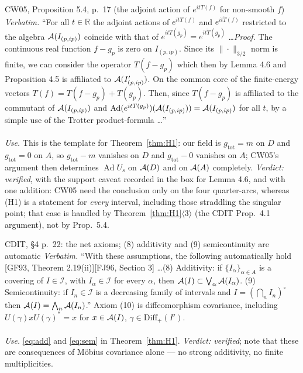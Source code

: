 \documentclass[11pt]{article}
\newcommand{\Diff}{\mathrm{Diff}_+}
\newcommand{\gtot}{g_{\mathrm{tot}}}
\newcommand{\Ad}{\operatorname{Ad}}
\begin{document}
\begin{citedbox}{CW05, Proposition 5.4, p.~17 (the adjoint action of $e^{itT(f)}$ for non-smooth $f$)}
\emph{Verbatim.}  ``For all $t\in\mathbb R$ the adjoint actions of $e^{itT(f)}$ and $e^{it\widetilde T(f)}$ restricted to
the algebra $\mathcal A(I_{(p,ip)})$ coincide with that of $e^{itT(g_p)}=e^{it\widetilde T(g_p)}$ \dots  \emph{Proof.} The
continuous real function $f-g_p$ is zero on $I_{(p,ip)}$.  Since its $\|\cdot\|_{3/2}$ norm is finite, we can consider
the operator $T(f-g_p)$ which then by Lemma 4.6 and Proposition 4.5 is affiliated to $\mathcal A(I'_{(p,ip)})$.  On the common
core of the finite-energy vectors $T(f)=T(f-g_p)+T(g_p)$.  Then, since $T(f-g_p)$ is affiliated to the commutant of
$\mathcal A(I_{(p,ip)})$ and $\Ad(e^{itT(g_p)})(\cA(I_{(p,ip)}))=\cA(I_{(p,ip)})$ for all $t$, by a simple use of the Trotter
product-formula \dots''\\[2pt]
\\[2pt]
\emph{Use.}  This is the template for Theorem~\ref{thm:H1}: our field is $\gtot=m$ on $D$ and $\gtot=0$ on $A$, so
$\gtot-m$ vanishes on $D$ and $\gtot-0$ vanishes on $A$; CW05's argument then determines $\Ad U_s$ on $\mathcal A(D)$ and on
$\mathcal A(A)$ completely.  \emph{Verdict: verified}, with the support caveat recorded in the box for Lemma 4.6, and with
one addition: CW05 need the conclusion only on the four quarter-arcs, whereas (H1) is a statement for \emph{every}
interval, including those straddling the singular point; that case is handled by Theorem~\ref{thm:H1}$\langle3\rangle$
(the CDIT Prop.~4.1 argument), not by Prop.~5.4.
\end{citedbox}

\begin{citedbox}{CDIT, \S4 p.~22: the net axioms; (8) additivity and (9) semicontinuity are automatic}
\emph{Verbatim.}  ``With these assumptions, the following automatically hold [GF93, Theorem 2.19(ii)][FJ96, Section 3]
\dots (8) Additivity: if $\{I_\alpha\}_{\alpha\in A}$ is a covering of $I\in\mathcal I$, with $I_\alpha\in\mathcal I$
for every $\alpha$, then $\mathcal A(I)\subset\bigvee_\alpha\mathcal A(I_\alpha)$. (9) Semicontinuity: if $I_n\in\mathcal I$ is a
decreasing family of intervals and $I=(\bigcap_nI_n)^\circ$ then $\mathcal A(I)=\bigwedge_n\mathcal A(I_n)$.''  Axiom (10) is
diffeomorphism covariance, including $U(\gamma)xU(\gamma)^*=x$ for $x\in\mathcal A(I)$, $\gamma\in\Diff(I')$.\\[2pt]
\\[2pt]
\emph{Use.}  \eqref{eq:add} and \eqref{eq:sem} in Theorem~\ref{thm:H1}.  \emph{Verdict: verified};
note that these are consequences of M\"obius covariance alone --- no strong additivity, no finite multiplicities.
\end{citedbox}
\end{document}
